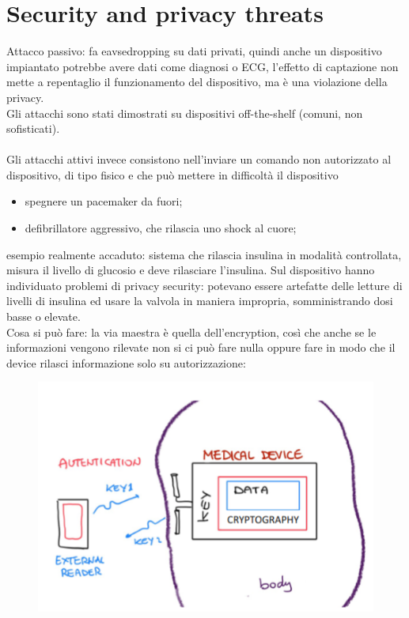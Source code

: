 \documentclass[oneside, 12pt]{extbook}
\begin{document}
\section{Security and privacy threats}
Attacco passivo: fa eavsedropping su dati privati, quindi anche un dispositivo impiantato potrebbe avere dati come diagnosi o ECG, l'effetto di captazione non mette a repentaglio il funzionamento del dispositivo, ma è una violazione della privacy.\\Gli attacchi sono stati dimostrati su dispositivi off-the-shelf (comuni, non sofisticati).\\\\Gli attacchi attivi invece consistono nell'inviare un comando non autorizzato al dispositivo, di tipo fisico e che può mettere in difficoltà il dispositivo
\begin{itemize}
	\item spegnere un pacemaker da fuori;
	\item defibrillatore aggressivo, che rilascia uno shock al cuore;
\end{itemize}
esempio realmente accaduto: sistema che rilascia insulina in modalità controllata, misura il livello di glucosio e deve rilasciare l'insulina. Sul dispositivo hanno individuato problemi di privacy security: potevano essere artefatte delle letture di livelli di insulina ed usare la valvola in maniera impropria, somministrando dosi basse o elevate.\\Cosa si può fare: la via maestra è quella dell'encryption, così che anche se le informazioni vengono rilevate non si ci può fare nulla oppure fare in modo che il device rilasci informazione solo su autorizzazione:\\
\begin{figure}[!h]
	\includegraphics[scale=0.3]{immagini/dev-security.png}
\end{figure}
\end{document}
